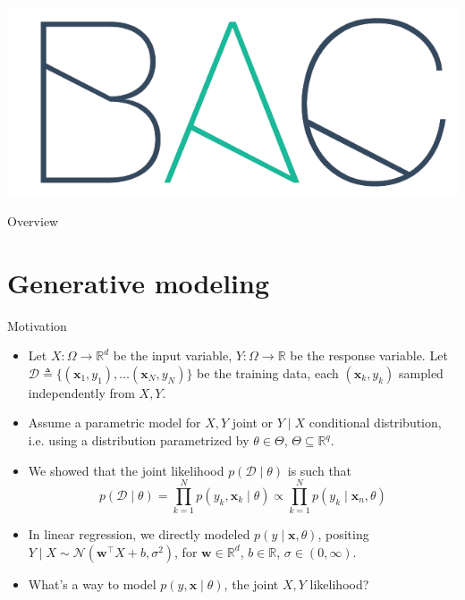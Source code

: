 \documentclass{beamer}
\title[\lecturetitle]{\lecturetitle}
\author[Derek Huang (BAC Advanced Team)]{Derek Huang}
\institute{BAC Advanced Team}
\date{October 1, 2021}
\numberwithin{equation}{section}
\begin{document}
\begin{frame}
    \titlepage
    \centering
    \includegraphics[scale = 0.1]{../bac_logo1.png}
\end{frame}

\begin{frame}{Overview}
    \tableofcontents
\end{frame}

\section{Generative modeling}

\begin{frame}{Motivation}
    \begin{itemize}
        \item
        Let $ X : \Omega \rightarrow \mathbb{R}^d $ be the input variable,
        $ Y : \Omega \rightarrow \mathbb{R} $ be the response variable. Let
        $ \mathcal{D} \triangleq \{(\mathbf{x}_1, y_1), \ldots
        (\mathbf{x}_N, y_N)\} $ be the training data, each $ (\mathbf{x}_k,
        y_k) $ sampled independently from $ X, Y $.

        \item
        Assume a parametric model for $ X, Y $ joint or $ Y \mid X $
        conditional distribution, i.e. using a distribution parametrized by
        $ \theta \in \Theta $, $ \Theta \subseteq \mathbb{R}^q $.

        \item
        We showed that the joint likelihood $ p(\mathcal{D} \mid \theta) $
        is such that
        \begin{equation*}
            p(\mathcal{D} \mid \theta) =
            \prod_{k = 1}^Np(y_k, \mathbf{x}_k \mid \theta) \propto
            \prod_{k = 1}^Np(y_k \mid \mathbf{x}_n, \theta)
        \end{equation*}

        \item
        In linear regression, we directly modeled
        $ p(y \mid \mathbf{x}, \theta) $, positing
        $ Y \mid X \sim \mathcal{N}(\mathbf{w}^\top X + b,
        \sigma^2) $, for $ \mathbf{w} \in \mathbb{R}^d $,
        $ b \in \mathbb{R} $, $ \sigma \in (0, \infty) $.

        \item
        What's a way to model $ p(y, \mathbf{x} \mid \theta) $, the joint
        $ X, Y $ likelihood?
    \end{itemize}
\end{frame}
\end{document}
